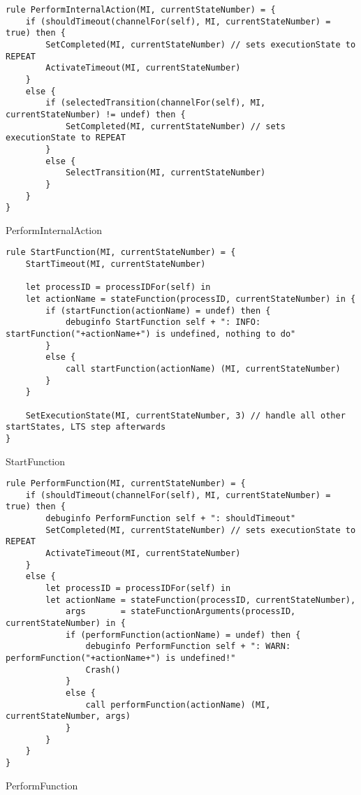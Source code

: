 \begin{listing}[H]
\begin{verbatim}
rule PerformInternalAction(MI, currentStateNumber) = {
    if (shouldTimeout(channelFor(self), MI, currentStateNumber) = true) then {
        SetCompleted(MI, currentStateNumber) // sets executionState to REPEAT
        ActivateTimeout(MI, currentStateNumber)
    }
    else {
        if (selectedTransition(channelFor(self), MI, currentStateNumber) != undef) then {
            SetCompleted(MI, currentStateNumber) // sets executionState to REPEAT
        }
        else {
            SelectTransition(MI, currentStateNumber)
        }
    }
}
\end{verbatim}
\caption{PerformInternalAction}
\label{lst:asm:PerformInternalAction}
\end{listing}






\begin{listing}[H]
\begin{verbatim}
rule StartFunction(MI, currentStateNumber) = {
    StartTimeout(MI, currentStateNumber)

    let processID = processIDFor(self) in
    let actionName = stateFunction(processID, currentStateNumber) in {
        if (startFunction(actionName) = undef) then {
            debuginfo StartFunction self + ": INFO: startFunction("+actionName+") is undefined, nothing to do"
        }
        else {
            call startFunction(actionName) (MI, currentStateNumber)
        }
    }

    SetExecutionState(MI, currentStateNumber, 3) // handle all other startStates, LTS step afterwards
}
\end{verbatim}
\caption{StartFunction}
\label{lst:asm:StartFunction}
\end{listing}




\begin{listing}[H]
\begin{verbatim}
rule PerformFunction(MI, currentStateNumber) = {
    if (shouldTimeout(channelFor(self), MI, currentStateNumber) = true) then {
        debuginfo PerformFunction self + ": shouldTimeout"
        SetCompleted(MI, currentStateNumber) // sets executionState to REPEAT
        ActivateTimeout(MI, currentStateNumber)
    }
    else {
        let processID = processIDFor(self) in
        let actionName = stateFunction(processID, currentStateNumber),
            args       = stateFunctionArguments(processID, currentStateNumber) in {
            if (performFunction(actionName) = undef) then {
                debuginfo PerformFunction self + ": WARN: performFunction("+actionName+") is undefined!"
                Crash()
            }
            else {
                call performFunction(actionName) (MI, currentStateNumber, args)
            }
        }
    }
}
\end{verbatim}
\caption{PerformFunction}
\label{lst:asm:PerformFunction}
\end{listing}




